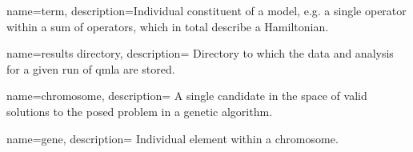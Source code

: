 {
    name=term,
    description={Individual constituent of a model, 
    e.g. a single operator within a sum of operators, which in total describe a Hamiltonian.
    }
}

{
    name=results directory,
    description={
        Directory to which the data and analysis for a given \gls{run} of \gls{qmla} are stored.
    }
}

{
    name=chromosome,
    description={
        A single candidate in the space of valid solutions to the posed problem in a genetic algorithm.
    }
}

{
    name=gene,
    description={
        Individual element within a \gls{chromosome}.
    }
}


\makeglossaries
